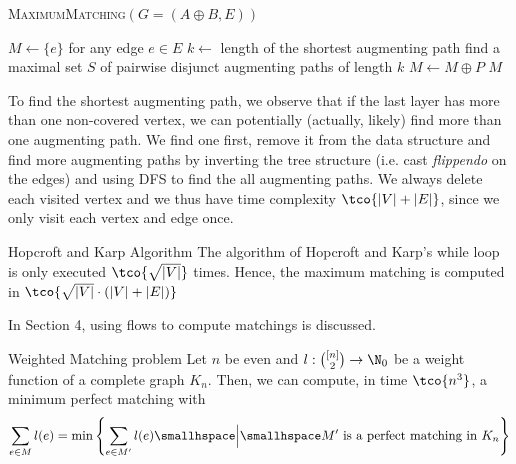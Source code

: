 \begin{algorithm}
    \caption{\textsc{MaximumMatching}$(G = (A \oplus B, E))$}
    \begin{algorithmic}[1]
        \State $M \gets \{e\}$ for any edge $e \in E$ 
            \State $k \gets$ length of the shortest augmenting path
            \State find a maximal set $S$ of pairwise disjunct augmenting paths of length $k$
                \State $M \gets M \oplus P$ 
            \EndFor
        \EndWhile
        \State \Return $M$
    \end{algorithmic}
\end{algorithm}
To find the shortest augmenting path, we observe that if the last layer has more than one non-covered vertex, we can potentially (actually, likely) find more than one augmenting path.
We find one first, remove it from the data structure and find more augmenting paths by inverting the tree structure (i.e. cast \textit{flippendo} on the edges) and using DFS to find the all augmenting paths.
We always delete each visited vertex and we thus have time complexity $\tco{|V| + |E|}$, since we only visit each vertex and edge once.

\begin{theorem}[]{Hopcroft and Karp Algorithm}
    The algorithm of Hopcroft and Karp's while loop is only executed $\tco{\sqrt{|V|}}$ times.
    Hence, the maximum matching is computed in $\tco{\sqrt{|V|} \cdot (|V| + |E|)}$
\end{theorem}

\newpage
{}

In Section 4, using flows to compute matchings is discussed.

\begin{theorem}[]{Weighted Matching problem}
    Let $n$ be even and $l: {[n] \choose 2} \rightarrow \N_0$ be a weight function of a complete graph $K_n$. Then, we can compute, in time $\tco{n^3}$, a minimum perfect matching with
    \begin{align*}
        \sum_{e \in M} l(e) = \min\left\{ \sum_{e \in M'} l(e) \smallhspace \Big| \smallhspace M' \text{ is a perfect matching in } K_n \right\}
    \end{align*}
\end{theorem}

